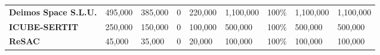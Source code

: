 \begin{landscape}
\begin{table}[H]
{\begin{tabular}{p{5cm}p{5cm}p{5cm}p{5cm}p{5cm}p{5cm}p{5cm}p{5cm}p{5cm}}
    \textbf{Deimos Space S.L.U.}                 & 495,000                                                                                               & 385,000                                                                                         &0                                                                                                                & 220,000                                                                                    & 1,100,000                                                                                                  & 100\%                                                                                                & 1,100,000                                                                                           & 1,100,000                                                                                             \\
    \textbf{ICUBE-SERTIT}                                                                    & 250,000                                                                                               & 150,000                                                                                         &0                                                                                                                & 100,000                                                                                    & 500,000                                                                                                    & 100\%                                                                                                & 500,000                                                                                             & 500,000                                                                                               \\
    \textbf{ReSAC}                                                                           & 45,000                                                                                                & 35,000                                                                                          &0                                                                                                                & 20,000                                                                                     & 100,000                                                                                                    & 100\%                                                                                                & 100,000                                                                                             & 100,000                                                                                               \\

\end{tabular}}
\end{table}
\end{landscape}
